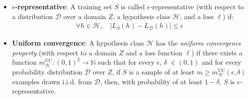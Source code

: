 \documentclass[../template.tex]{subfiles}
\begin{document}
\begin{itemize}
    \item \textbf{$\epsilon$-representative}: A training set $S$ is called $\epsilon$-representative (with respect to a distribution $\mathcal{D}$ over a domain $Z$, a hypothesis class $\mathcal{H}$, and a loss $\ell$) if:
    \begin{align*}
        \forall h \in \mathcal{H}, \quad |L_S(h) - L_{\mathcal{D}}(h)| \leq \epsilon
    \end{align*} 
    \item \textbf{Uniform convergence}: A hypothesis class $\mathcal{H}$ has the \textit{uniform convergence property} (with respect to a domain $Z$ and a loss function $\ell$) if there exists a function $m_{\mathcal{H}}^{\mathrm{UC}}\colon (0,1)^2 \to \mathbb{N}$ such that for every $\epsilon$, $\delta$ $\in (0,1)$ and for every probability distribution $\mathcal{D}$ over $Z$, if $S$ is a sample of at least $m \geq m_{\mathcal{H}}^{\mathrm{UC}}(\epsilon, \delta)$ examples drawn i.i.d. from $\mathcal{D}$, then, with probability of at least $1-\delta$, $S$ is $\epsilon$-representative.    
\end{itemize}
\end{document}
